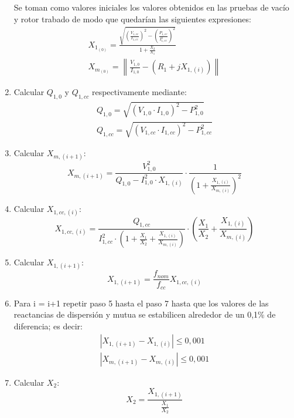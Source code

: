 \documentclass[11pt,letterpaper]{article}     %
\begin{document}
\begin{enumerate}
	Se toman como valores iniciales los valores obtenidos en las pruebas de vacío y rotor trabado de modo que quedarían las siguientes expresiones:
	\begin{align}
		X_{1_{(0)}} = \frac{\sqrt{\left(\frac{V_{1,cc}}{I_{1,cc}}\right)^{2}-\left(\frac{P_{1,cc}}{I_{1,cc}^{2}}\right)^{2}}}{1+\frac{X_{2}}{X_{1}}}\label{X10equ}\\
		X_{m_{(0)}} = \left\|\frac{V_{1,0}}{I_{1,0}}-(R_{1}+jX_{1,(i)})\right\| \label{Xm0equ}
	\end{align}
	\item Calcular $Q_{1,0}$ y $Q_{1,cc}$ respectivamente mediante:
	\begin{align}
		Q_{1,0} = \sqrt{(V_{1,0}\cdot I_{1,0})^{2}-P_{1,0}^{2}} \label{Q10equ}\\
		Q_{1,cc} = \sqrt{(V_{1,cc}\cdot I_{1,cc})^{2}-P_{1,cc}^{2}} \label{Q1ccequ}
	\end{align}
	\item Calcular $X_{m,(i+1)}$:
	\begin{equation}
		X_{m,(i+1)} = \frac{V_{1,0}^{2}}{Q_{1,0}-I_{1,0}^{2}\cdot X_{1,(i)}}\cdot \frac{1}{\left(1+\frac{X_{1,(i)}}{X_{m,(i)}}\right)^{2}}\label{Xm(i+1)equ}
	\end{equation}
	\item Calcular $X_{1,cc,(i)}$:
		\begin{equation}
	X_{1,cc,(i)} =  \frac{Q_{1,cc}}{I_{1,cc}^{2}\cdot\left(1+\frac{X_{1}}{X_{2}}+\frac{X_{1,(i)}}{X_{m,(i)}}\right)}\cdot\left(\frac{X_{1}}{X_{2}}+\frac{X_{1,(i)}}{X_{m,(i)}}\right) \label{X1cciequ} 
	\end{equation}
	\item Calcular $X_{1,(i+1)}$:
	\begin{equation}
		X_{1,(i+1)} = \frac{f_{nom}}{f_{cc}}X_{1,cc,(i)} \label{X1(i+1)equ}
	\end{equation}
	\item Para i = i+1 repetir paso 5 hasta el paso 7 hasta que los valores de las reactancias de dispersión y mutua se estabilicen alrededor de un 0,1\% de diferencia; es decir:
	\begin{align}
		|X_{1,(i+1)}-X_{1,(i)}| \leq 0,001 \label{esperadoX1}\\
		|X_{m,(i+1)}-X_{m,(i)}| \leq 0,001 \label{esperadoXm}
	\end{align}
	\item Calcular $X_{2}$:
	\begin{equation}
		X_{2} = \frac{X_{1,(i+1)}}{\frac{X_{1}}{X_{2}}} \label{X2equ}
	\end{equation}

\end{enumerate}
\end{document}
